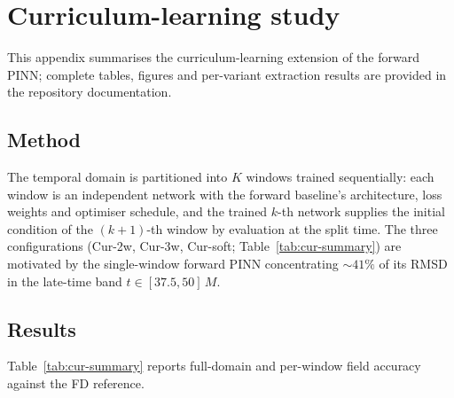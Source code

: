 \section{Curriculum-learning study}
\label{sec:res-cur}

This appendix summarises the curriculum-learning extension of
the forward PINN; complete tables, figures and per-variant
extraction results are provided in the repository
documentation.

\subsection{Method}
\label{sec:cur-pinn}

The temporal domain is partitioned into $K$ windows trained
sequentially: each window is an independent network with the
forward baseline's architecture, loss weights and optimiser
schedule, and the trained $k$-th network supplies the initial
condition of the $(k{+}1)$-th window by evaluation at the split
time. The three configurations (Cur-2w, Cur-3w, Cur-soft;
Table~\ref{tab:cur-summary}) are motivated by the
single-window forward PINN concentrating $\sim\!41\%$ of its
RMSD in the late-time band $t \in [37.5,50]\,M$.

\subsection{Results}

Table~\ref{tab:cur-summary} reports full-domain and per-window
field accuracy against the FD reference.

